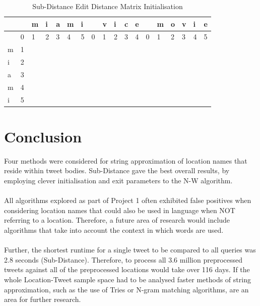 \documentclass[11pt,a4paper]{article}
\begin{document}
\begin{table}[ht]
	\centering
	\caption{Sub-Distance Edit Distance Matrix Initialisation}
    \begin{tabular}{l|lllllllllllllllll}
    ~ & ~ & m & i & a & m & i & ~ & v & i & c & e & ~ & m & o & v & i & e \\
    \hline
    ~ & 0 & 1 & 2 & 3 & 4 & 5 & 0 & 1 & 2 & 3 & 4 & 0 & 1 & 2 & 3 & 4 & 5 \\
    m & 1 & ~ & ~ & ~ & ~ & ~ & ~ & ~ & ~ & ~ & ~ & ~ & ~ & ~ & ~ & ~ & ~ \\
    i & 2 & ~ & ~ & ~ & ~ & ~ & ~ & ~ & ~ & ~ & ~ & ~ & ~ & ~ & ~ & ~ & ~ \\
    a & 3 & ~ & ~ & ~ & ~ & ~ & ~ & ~ & ~ & ~ & ~ & ~ & ~ & ~ & ~ & ~ & ~ \\
    m & 4 & ~ & ~ & ~ & ~ & ~ & ~ & ~ & ~ & ~ & ~ & ~ & ~ & ~ & ~ & ~ & ~ \\
    i & 5 & ~ & ~ & ~ & ~ & ~ & ~ & ~ & ~ & ~ & ~ & ~ & ~ & ~ & ~ & ~ & ~ \\
    \end{tabular}
    \label{table:subdist}
\end{table}


\section{Conclusion}

Four methods were considered for string approximation of location names that reside within tweet bodies. Sub-Distance gave the best overall results, by employing clever initialisation and exit parameters to the N-W algorithm.\\\\
All algorithms explored as part of Project 1 often exhibited false positives when considering location names that could also be used in language when NOT referring to a location. Therefore, a future area of research would include algorithms that take into account the context in which words are used.\\\\
Further, the shortest runtime for a single tweet to be compared to all queries was 2.8 seconds (Sub-Distance). Therefore, to process all 3.6 million preprocessed tweets against all of the preprocessed locations would take over 116 days. If the whole Location-Tweet sample space had to be analysed faster methods of string approximation, such as the use of Tries or N-gram matching algorithms, are an area for further research. 
\end{document}
